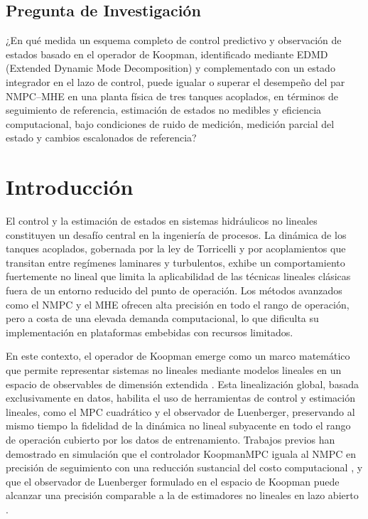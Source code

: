 \documentclass[12pt,letterpaper]{article}
\begin{document}
\subsection{Pregunta de Investigación}

¿En qué medida un esquema completo de control predictivo y observación de estados
basado en el operador de Koopman, identificado mediante EDMD (Extended Dynamic Mode
Decomposition) y complementado con un estado integrador en el lazo de control,
puede igualar o superar el desempeño del par NMPC--MHE en una planta física de tres
tanques acoplados, en términos de seguimiento de referencia, estimación de estados
no medibles y eficiencia computacional, bajo condiciones de ruido de medición,
medición parcial del estado y cambios escalonados de referencia?

\section{Introducción}
\label{sec:introduccion}

El control y la estimación de estados en sistemas hidráulicos no lineales
constituyen un desafío central en la ingeniería de procesos. La dinámica de los
tanques acoplados, gobernada por la ley de Torricelli y por acoplamientos que
transitan entre regímenes laminares y turbulentos, exhibe un comportamiento
fuertemente no lineal que limita la aplicabilidad de las técnicas lineales clásicas
fuera de un entorno reducido del punto de operación. Los métodos avanzados como el
NMPC y el MHE ofrecen alta precisión en todo el rango de operación, pero a costa de una elevada
demanda computacional, lo que dificulta su implementación en plataformas embebidas
con recursos limitados.

En este contexto, el operador de Koopman emerge como un marco matemático que permite
representar sistemas no lineales mediante modelos lineales en un espacio de
observables de dimensión extendida \cite{koopman1931, williams2015}. Esta
linealización global, basada exclusivamente en datos, habilita el uso de
herramientas de control y estimación lineales, como el MPC cuadrático y el
observador de Luenberger, preservando al mismo tiempo la fidelidad de la dinámica no
lineal subyacente en todo el rango de operación cubierto por los datos de
entrenamiento. Trabajos previos han demostrado en simulación que el controlador
KoopmanMPC iguala al NMPC en precisión de seguimiento con una reducción sustancial
del costo computacional \cite{korda2018, tellez2022}, y que el observador de
Luenberger formulado en el espacio de Koopman puede alcanzar una precisión
comparable a la de estimadores no lineales en lazo abierto \cite{surana2016,
netto2020}.
\end{document}
